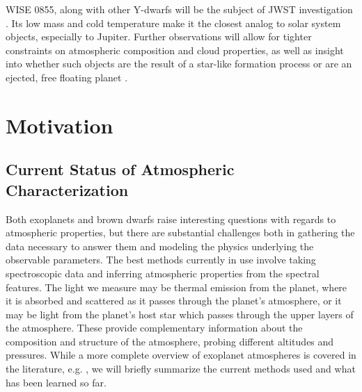 WISE 0855, along with other Y-dwarfs will be the subject of JWST investigation \parencite{Oliveira2015,Oliveira2019}.
Its low mass and cold temperature make it the closest analog to solar system objects, especially to Jupiter. 
Further observations will allow for tighter constraints on atmospheric composition and cloud properties, as well as insight into whether such objects are the result of a star-like formation process or are an ejected, free floating planet \parencite{Beichman2014}.
\section{Motivation}
\subsection{Current Status of Atmospheric Characterization}
Both exoplanets and brown dwarfs raise interesting questions with regards to atmospheric properties, but there are substantial challenges both in gathering the data necessary to answer them and modeling the physics underlying the observable parameters. 
The best methods currently in use involve taking spectroscopic data and inferring atmospheric properties from the spectral features.
The light we measure may be thermal emission from the planet, where it is absorbed and scattered as it passes through the planet's atmosphere, or it may be light from the planet's host star which passes through the upper layers of the atmosphere.
These provide complementary information about the composition and structure of the atmosphere, probing different altitudes and pressures.
While a more complete overview of exoplanet atmospheres is covered in the literature, e.g. \parencite{Bozza,Madhusudhan2014,Seager2010}, we will briefly summarize the current methods used and what has been learned so far.
